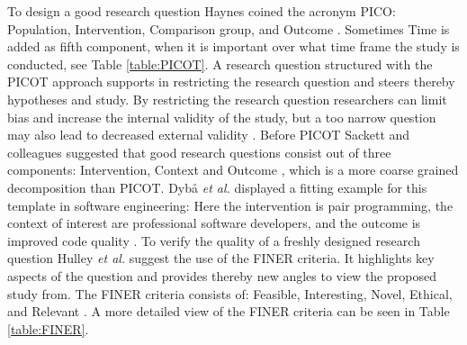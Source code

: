 To design a good research question Haynes coined the acronym PICO: Population, Intervention, Comparison group, and Outcome \cite{BrianHaynes2006}. Sometimes Time is added as fifth component, when it is important over what time frame the study is conducted, see Table \ref{table:PICOT}. A research question structured with the PICOT approach supports in restricting the research question and steers thereby hypotheses and study. By restricting the research question researchers can limit bias and increase the internal validity of the study, but a too narrow question may also lead to decreased external validity \cite{Farrugia2009}. Before PICOT Sackett and colleagues suggested that good research questions consist out of three components: Intervention, Context and Outcome \cite{Sackett2000}, which is a more coarse grained decomposition than PICOT. Dyb{\aa} \emph{et al.} displayed a fitting example for this template in software engineering:  \cite[p. 60]{Dyba2005} Here the intervention is pair programming, the context of interest are professional software developers, and the outcome is improved code quality \cite{Dyba2005}. To verify the quality of a freshly designed research question Hulley \emph{et al.} suggest the use of the FINER criteria. It highlights key aspects of the question and provides thereby new angles to view the proposed study from. The FINER criteria consists of: Feasible, Interesting, Novel, Ethical, and Relevant \cite{Farrugia2009}. A more detailed view of the FINER criteria can be seen in Table \ref{table:FINER}.   

